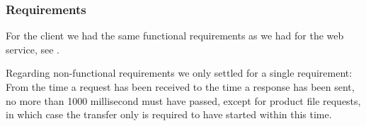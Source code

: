\subsubsection{Requirements}
For the client we had the same functional requirements as we had for the web service, see .

Regarding non-functional requirements we only settled for a single requirement: From the time a request has been received to the time a response has been sent, no more than 1000 millisecond must have passed, except for product file requests, in which case the transfer only is required to have started within this time.